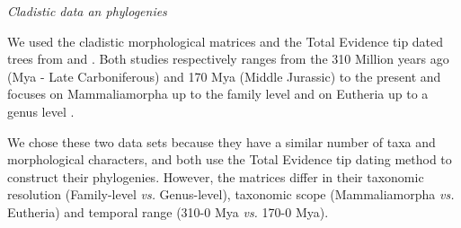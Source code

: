 \documentclass[12pt,letterpaper]{article}
\renewcommand{\subsection}[1]{%
\bigskip
\begin{center}
\begin{large}
\normalfont\itshape #1
\end{large}
\end{center}}
\begin{document}

\subsection{Cladistic data an phylogenies}
We used the cladistic morphological matrices and the Total Evidence tip dated trees \citep{ronquista2012} from \cite[][103 taxa and 446 morphological characters]{MEE3:MEE312084} and \cite[][102 taxa and 421 morphological characters]{beckancient2014}. Both studies respectively ranges from the 310 Million years ago (Mya - Late Carboniferous) and 170 Mya (Middle Jurassic) to the present and focuses on Mammaliamorpha up to the family level \cite{MEE3:MEE312084} and on Eutheria up to a genus level \cite{beckancient2014}. 

We chose these two data sets because they have a similar number of taxa and morphological characters, and both use the Total Evidence tip dating method \citep{ronquista2012} to construct their phylogenies. However, the matrices differ in their taxonomic resolution (Family-level \textit{vs.} Genus-level), taxonomic scope (Mammaliamorpha \textit{vs.} Eutheria) and temporal range (310-0 Mya \textit{vs.} 170-0 Mya). %
\end{document}

